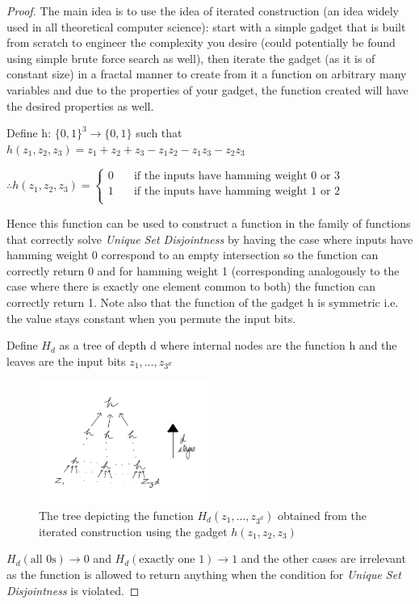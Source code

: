 \documentclass[usletter]{article}
\begin{document}
\begin{proof}
The main idea is to use the idea of iterated construction (an idea widely used in all theoretical computer science): start with a simple gadget that is built from scratch to engineer the complexity you desire (could potentially be found using simple brute force search as well), then iterate the gadget (as it is of constant size) in a fractal manner to create from it a function on arbitrary many variables and due to the properties of your gadget, the function created will have the desired properties as well. \newline

\noindent Define h: ${\{0, 1\}}^3 \rightarrow \{0, 1\}$ such that $h(z_1, z_2, z_3) = z_1 + z_2 + z_3 - z_1z_2 - z_1z_3 - z_2z_3$\newline

\noindent $\therefore h(z_1, z_2, z_3) = 
     \begin{cases}
       \text{0} &\quad\text{if the inputs have hamming weight 0 or 3} \\
       \text{1} &\quad\text{if the inputs have hamming weight 1 or 2} \\
     \end{cases}
$ \newline

\noindent Hence this function can be used to construct a function in the family of functions that correctly solve \emph{Unique Set Disjointness} by having the case where inputs have hamming weight 0 correspond to an empty intersection so the function can correctly return 0 and for hamming weight 1 (corresponding analogously to the case where there is exactly one element common to both) the function can correctly return 1. Note also that the function of the gadget h is symmetric i.e. the value stays constant when you permute the input bits. \newline 

\noindent Define $H_d$ as a tree of depth d where internal nodes are the function h and the leaves are the input bits $z_1, ... ,z_{3^d}$ \newline

\begin{figure}
\centering
\includegraphics[width=0.5\textwidth]{H_d-tree}
\caption{The tree depicting the function $H_d(z_1, ... ,z_{3^d})$ obtained from the iterated construction using the gadget $h(z_1, z_2, z_3)$ } \label{fig:H_d-treel}
\end{figure}
\noindent $H_d(\text{all 0s}) \rightarrow 0$ and $H_d(\text{exactly one 1}) \rightarrow 1$ and the other cases are irrelevant as the function is allowed to return anything when the condition for \emph {Unique Set Disjointness} is violated. \newline


\end{proof}
\end{document}
